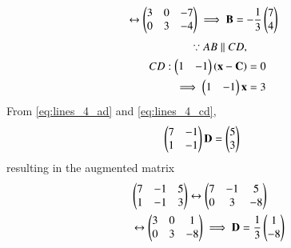 \documentclass[journal,12pt,twocolumn]{IEEEtran}
\begin{document}
\begin{enumerate}[label=\arabic*]
\begin{align}
&\leftrightarrow
 \begin{pmatrix}3 & 0 & -7\\ 0 & 3 & -4\end{pmatrix} \implies \mathbf{B} = -\frac{1}{3}\begin{pmatrix}7\\4\end{pmatrix}
\end{align}
\begin{align}
\because AB \parallel CD,&
\nonumber \\
CD: \begin{pmatrix}1 & -1\end{pmatrix}\left(\mathbf{x}-\mathbf{C}\right) &=0
\nonumber \\
\implies \begin{pmatrix}1 & -1\end{pmatrix}\mathbf{x} &=3
\label{eq:lines_4_cd}
\end{align}
%
From \eqref{eq:lines_4_ad} and \eqref{eq:lines_4_cd},
\begin{align}
 \begin{pmatrix}7 & -1 \\ 1 & -1\end{pmatrix}\mathbf{D} &=\begin{pmatrix}5 \\ 3\end{pmatrix}
\end{align}
resulting in the augmented matrix
\begin{align}
& \begin{pmatrix}7 & -1 & 5\\ 1 & -1 & 3\end{pmatrix} 
\leftrightarrow
 \begin{pmatrix}7 & -1 & 5\\ 0 & 3 & -8\end{pmatrix} 
\nonumber \\
&\leftrightarrow
 \begin{pmatrix}3 & 0 & 1\\ 0 & 3 & -8\end{pmatrix} \implies \mathbf{D} = \frac{1}{3}\begin{pmatrix}1\\-8\end{pmatrix}
\end{align}

%


\end{enumerate}
\end{document}
